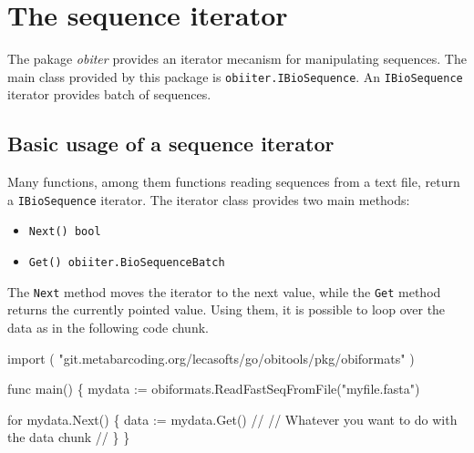 \documentclass[
  letterpaper,
  DIV=11,
  numbers=noendperiod]{scrreprt}
\newenvironment{Shaded}{\begin{snugshade}}{\end{snugshade}}
\newcommand{\CommentTok}[1]{\textcolor[rgb]{0.37,0.37,0.37}{#1}}
\newcommand{\ControlFlowTok}[1]{\textcolor[rgb]{0.00,0.23,0.31}{#1}}
\newcommand{\KeywordTok}[1]{\textcolor[rgb]{0.00,0.23,0.31}{#1}}
\newcommand{\NormalTok}[1]{\textcolor[rgb]{0.00,0.23,0.31}{#1}}
\newcommand{\OperatorTok}[1]{\textcolor[rgb]{0.37,0.37,0.37}{#1}}
\newcommand{\StringTok}[1]{\textcolor[rgb]{0.13,0.47,0.30}{#1}}
\providecommand{\tightlist}{%
  \setlength{\itemsep}{0pt}\setlength{\parskip}{0pt}}\usepackage{longtable,booktabs,array}
\begin{document}
\hypertarget{the-sequence-iterator}{%
\section*{The sequence iterator}\label{the-sequence-iterator}}


The pakage \emph{obiter} provides an iterator mecanism for manipulating
sequences. The main class provided by this package is
\texttt{obiiter.IBioSequence}. An \texttt{IBioSequence} iterator
provides batch of sequences.

\hypertarget{basic-usage-of-a-sequence-iterator}{%
\subsection*{Basic usage of a sequence
iterator}\label{basic-usage-of-a-sequence-iterator}}

Many functions, among them functions reading sequences from a text file,
return a \texttt{IBioSequence} iterator. The iterator class provides two
main methods:

\begin{itemize}
\tightlist
\item
  \texttt{Next()\ bool}
\item
  \texttt{Get()\ obiiter.BioSequenceBatch}
\end{itemize}

The \texttt{Next} method moves the iterator to the next value, while the
\texttt{Get} method returns the currently pointed value. Using them, it
is possible to loop over the data as in the following code chunk.

\begin{Shaded}
\begin{Highlighting}[]
\KeywordTok{import} \OperatorTok{(}
    \StringTok{"git.metabarcoding.org/lecasofts/go/obitools/pkg/obiformats"}
\OperatorTok{)}

\KeywordTok{func}\NormalTok{ main}\OperatorTok{()} \OperatorTok{\{}
\NormalTok{    mydata }\OperatorTok{:=}\NormalTok{ obiformats}\OperatorTok{.}\NormalTok{ReadFastSeqFromFile}\OperatorTok{(}\StringTok{"myfile.fasta"}\OperatorTok{)}
       
    \ControlFlowTok{for}\NormalTok{ mydata}\OperatorTok{.}\NormalTok{Next}\OperatorTok{()} \OperatorTok{\{}
\NormalTok{        data }\OperatorTok{:=}\NormalTok{ mydata}\OperatorTok{.}\NormalTok{Get}\OperatorTok{()}
        \CommentTok{//}
        \CommentTok{// Whatever you want to do with the data chunk}
        \CommentTok{//}
    \OperatorTok{\}}
\OperatorTok{\}}
\end{Highlighting}
\end{Shaded}
\end{document}
